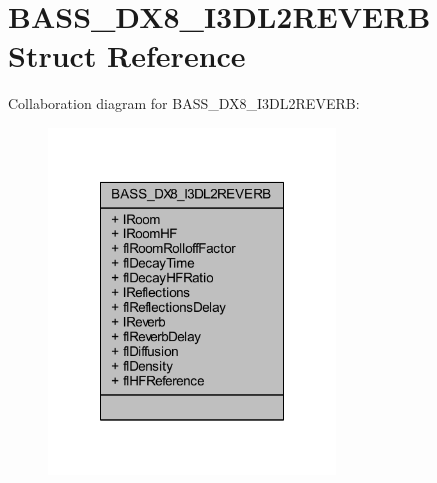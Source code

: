 \hypertarget{struct_b_a_s_s___d_x8___i3_d_l2_r_e_v_e_r_b}{\section{B\-A\-S\-S\-\_\-\-D\-X8\-\_\-\-I3\-D\-L2\-R\-E\-V\-E\-R\-B Struct Reference}
\label{struct_b_a_s_s___d_x8___i3_d_l2_r_e_v_e_r_b}
}


Collaboration diagram for B\-A\-S\-S\-\_\-\-D\-X8\-\_\-\-I3\-D\-L2\-R\-E\-V\-E\-R\-B\-:\nopagebreak
\begin{figure}[H]
\begin{center}
\leavevmode
\includegraphics[width=216pt]{struct_b_a_s_s___d_x8___i3_d_l2_r_e_v_e_r_b__coll__graph}
\end{center}
\end{figure}

